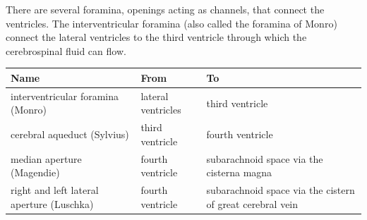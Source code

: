\documentclass[]{book}
\begin{document}
There are several foramina, openings acting as channels, that connect the ventricles. The interventricular foramina (also called the foramina of Monro) connect the lateral ventricles to the third ventricle through which the cerebrospinal fluid can flow.

\begin{longtable}[]{@{}lll@{}}
\toprule
\begin{minipage}[b]{0.34\columnwidth}\raggedright
Name\strut
\end{minipage} & \begin{minipage}[b]{0.34\columnwidth}\raggedright
From\strut
\end{minipage} & \begin{minipage}[b]{0.23\columnwidth}\raggedright
To\strut
\end{minipage}\tabularnewline
\midrule
\endhead
\begin{minipage}[t]{0.34\columnwidth}\raggedright
interventricular foramina (Monro)\strut
\end{minipage} & \begin{minipage}[t]{0.34\columnwidth}\raggedright
lateral ventricles\strut
\end{minipage} & \begin{minipage}[t]{0.23\columnwidth}\raggedright
third ventricle\strut
\end{minipage}\tabularnewline
\begin{minipage}[t]{0.34\columnwidth}\raggedright
cerebral aqueduct (Sylvius)\strut
\end{minipage} & \begin{minipage}[t]{0.34\columnwidth}\raggedright
third ventricle\strut
\end{minipage} & \begin{minipage}[t]{0.23\columnwidth}\raggedright
fourth ventricle\strut
\end{minipage}\tabularnewline
\begin{minipage}[t]{0.34\columnwidth}\raggedright
median aperture (Magendie)\strut
\end{minipage} & \begin{minipage}[t]{0.34\columnwidth}\raggedright
fourth ventricle\strut
\end{minipage} & \begin{minipage}[t]{0.23\columnwidth}\raggedright
subarachnoid space via the cisterna magna\strut
\end{minipage}\tabularnewline
\begin{minipage}[t]{0.34\columnwidth}\raggedright
right and left lateral aperture (Luschka)\strut
\end{minipage} & \begin{minipage}[t]{0.34\columnwidth}\raggedright
fourth ventricle\strut
\end{minipage} & \begin{minipage}[t]{0.23\columnwidth}\raggedright
subarachnoid space via the cistern of great cerebral vein\strut
\end{minipage}\tabularnewline
\bottomrule
\end{longtable}
\end{document}
